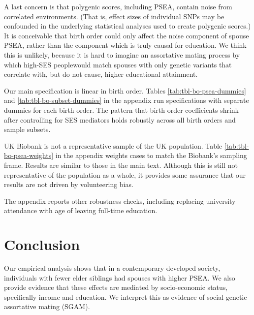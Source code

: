 \documentclass[
]{article}
\theoremstyle{definition}
\theoremstyle{definition}
\theoremstyle{definition}
\theoremstyle{definition}
\theoremstyle{remark}
\begin{document}
A last concern is that polygenic scores, including PSEA, contain noise from
correlated environments. (That is, effect sizes of individual SNPs may be
confounded in the underlying statistical analyses used to create polygenic
scores.) It is conceivable that birth order could only affect the noise
component of spouse PSEA, rather than the component which is truly causal for
education. We think this is unlikely, because it is hard to imagine an
assortative mating process by which high-SES peoplewould match spouses with
only genetic variants that correlate with, but do not cause, higher educational
attainment.

Our main specification is linear in birth order. Tables
\ref{tab:tbl-bo-psea-dummies} and \ref{tab:tbl-bo-subset-dummies} in the
appendix run specifications with separate dummies for each birth order. The
pattern that birth order coefficients shrink after controlling for SES mediators
holds robustly across all birth orders and sample subsets.

UK Biobank is not a representative sample of the UK population. Table
\ref{tab:tbl-bo-psea-weights} in the appendix weights cases to match the
Biobank's sampling frame. Results are similar to those in the main text.
Although this is still not representative of the population as a whole, it
provides some assurance that our results are not driven by volunteering bias.

The appendix reports other robustness checks, including replacing university
attendance with age of leaving full-time education.

\hypertarget{conclusion}{%
\section{Conclusion}\label{conclusion}}

Our empirical analysis shows that in a contemporary developed society,
individuals with fewer elder siblings had spouses with higher PSEA. We also provide
evidence that these effects are mediated by socio-economic status, specifically
income and education. We interpret this as evidence of social-genetic assortative
mating (SGAM).
\end{document}
